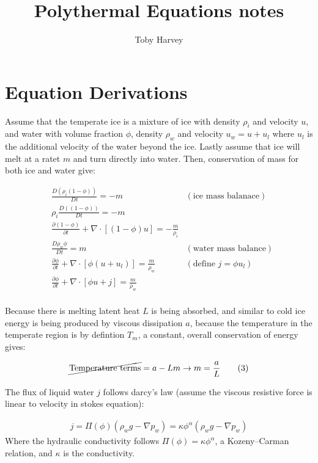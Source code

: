 \documentclass[a4paper,12pt]{article}
\newcommand{\pd}[2]{\frac{\partial #1}{\partial #2}}
\begin{document}
\title{Polythermal Equations notes}
\author{Toby Harvey}
\maketitle
\vspace{-1cm}

\section{Equation Derivations}

Assume that the temperate ice is a mixture of ice with density $\rho_i$ and velocity $u$, and water with volume fraction $\phi$, density $\rho_w$ and velocity $u_w = u + u_l$ where $u_l$ is the additional velocity of the water beyond the ice. Lastly assume that ice will melt at a ratet $m$ and turn directly into water. Then, conservation of mass for both ice and water give:

\begin{align*}
  &\frac{D(\rho_i(1 - \phi))}{Dt} = -m & (\text{ice mass balanace})\\
  &\rho_i\frac{D((1 - \phi))}{Dt} = -m \\
  &\pd{(1 - \phi)}{t} + \nabla \cdot[(1-\phi)u] = -\frac{m}{\rho_i} \tag{1} \label{eq:ice-mass-balance}\\
  &\frac{D\rho_w\phi}{Dt} = m & (\text{water mass balance})\\
  &\pd{\phi}{t} + \nabla \cdot [\phi(u + u_l)] = \frac{m}{\rho_w} & (\text{define } j = \phi u_l)\\
  &\pd{\phi}{t} + \nabla \cdot [\phi u + j] = \frac{m}{\rho_w} \tag{2} \label{eq:water-mass-balance} \\
\end{align*}

Because there is melting latent heat $L$ is being absorbed, and similar to cold ice energy is being produced by viscous dissipation $a$, because the temperature in the temperate region is by defintion $T_m$, a constant, overall conservation of energy gives:

\begin{align*}
  \cancel{\text{Temperature terms}}= a - Lm \rightarrow m = \frac{a}{L} \tag{3} \label{eq:conservation-of-energy}
\end{align*}

The flux of liquid water $j$ follows darcy's law (assume the viscous resistive force is linear to velocity in stokes equation):

\begin{align*}
  j = \Pi(\phi)(\rho_w g - \nabla p_w) =  \kappa\phi^\alpha(\rho_w g - \nabla p_w)\tag{4} \label{eq:darcys-law}
\end{align*}
Where the hydraulic conductivity follows $\Pi(\phi) =\kappa \phi^\alpha$, a Kozeny–Carman relation, and $\kappa$ is the conductivity.
\end{document}
